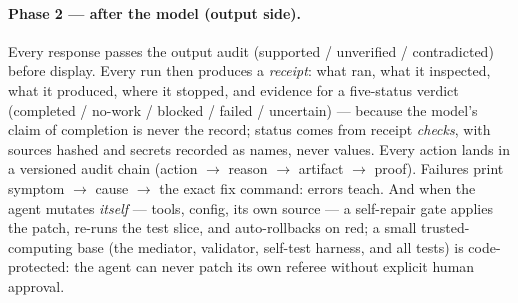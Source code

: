 \documentclass[11pt]{article}
\begin{document}
\paragraph{Phase 2 --- after the model (output side).} Every response passes the output audit (supported / unverified / contradicted) before display. Every run then produces a \emph{receipt}: what ran, what it inspected, what it produced, where it stopped, and evidence for a five-status verdict (completed / no-work / blocked / failed / uncertain) --- because the model's claim of completion is never the record; status comes from receipt \emph{checks}, with sources hashed and secrets recorded as names, never values. Every action lands in a versioned audit chain (action $\to$ reason $\to$ artifact $\to$ proof). Failures print symptom $\to$ cause $\to$ the exact fix command: errors teach. And when the agent mutates \emph{itself} --- tools, config, its own source --- a self-repair gate applies the patch, re-runs the test slice, and auto-rollbacks on red; a small trusted-computing base (the mediator, validator, self-test harness, and all tests) is code-protected: the agent can never patch its own referee without explicit human approval.
\end{document}
